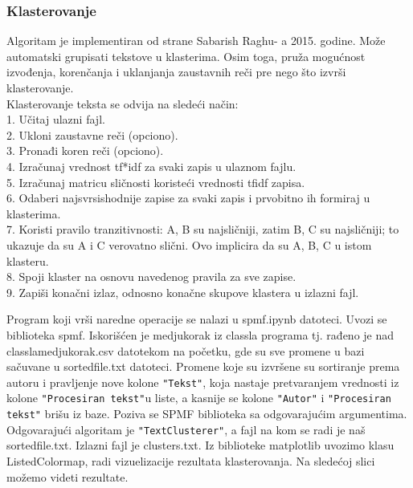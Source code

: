 \documentclass{article}
\begin{document}
\vspace{2.5mm}


\subsubsection{Klasterovanje}
\begin{flushleft}


Algoritam je implementiran od strane Sabarish Raghu- a 2015. godine. Može automatski grupisati tekstove u klasterima. Osim toga, pruža mogućnost izvođenja, korenčanja i uklanjanja zaustavnih reči pre nego što izvrši klasterovanje.\\

\vspace{3mm}
Klasterovanje teksta se odvija na sledeći način:\\

1. Učitaj ulazni fajl.\\
2. Ukloni zaustavne reči (opciono).\\
3. Pronađi koren reči (opciono).\\
4. Izračunaj vrednost tf*idf za svaki zapis u ulaznom fajlu.\\
5. Izračunaj matricu sličnosti koristeći vrednosti tfidf zapisa.\\
6. Odaberi najsvrsishodnije zapise za svaki zapis i prvobitno ih formiraj u klasterima.\\
7. Koristi pravilo tranzitivnosti: A, B su najsličniji, zatim B, C su najsličniji; to ukazuje da su A i C verovatno slični. Ovo implicira da su A, B, C u istom klasteru.\\
8. Spoji klaster na osnovu navedenog pravila za sve zapise.\\
9. Zapiši konačni izlaz, odnosno konačne skupove klastera u izlazni fajl.\\

\vspace{3mm}

Program koji vrši naredne operacije se nalazi u spmf.ipynb datoteci.
\vspace{3mm}
\newpage
Uvozi se biblioteka spmf. Iskorišćen je medjukorak iz classla programa tj. rađeno je nad classla\textunderscore medjukorak.csv datotekom na početku, gde su sve promene u bazi sačuvane u sorted\textunderscore file.txt datoteci. Promene koje su izvršene su sortiranje prema autoru i pravljenje nove kolone \verb|"Tekst"|, koja nastaje pretvaranjem vrednosti iz kolone \verb|"Procesiran tekst"|u liste, a kasnije se kolone \verb|"Autor"| i \verb|"Procesiran tekst"| brišu iz baze.
Poziva se SPMF biblioteka sa odgovarajućim argumentima. Odgovarajući algoritam je \verb|"TextClusterer"|, a fajl na kom se radi je naš sorted\textunderscore file.txt. Izlazni fajl je clusters.txt. Iz biblioteke matplotlib uvozimo klasu ListedColormap, radi vizuelizacije rezultata klasterovanja. Na sledećoj slici možemo videti rezultate.


\end{flushleft}
\end{document}
